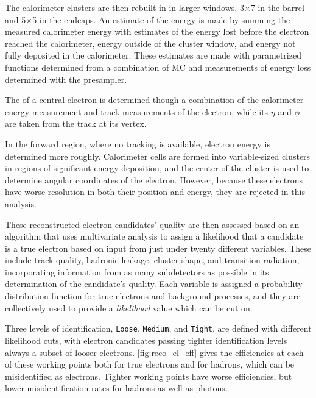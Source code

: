 The calorimeter clusters are then rebuilt in in larger windows, 3$\times$7 in the barrel and 5$\times$5 in the endcaps. An estimate of the energy is made by summing the measured calorimeter energy with estimates of the energy lost before the electron reached the calorimeter, energy outside of the cluster window, and energy not fully deposited in the calorimeter. These estimates are made with parametrized functions determined from a combination of \ac{MC} and measurements of energy loss determined with the presampler. 

The \pt of a central electron is determined though a combination of the calorimeter energy measurement and track measurements of the electron, while its $\eta$ and $\phi$ are taken from the track at its vertex. 

In the forward region, where no tracking is available, electron energy is determined more roughly. Calorimeter cells are formed into variable-sized clusters in regions of significant energy deposition, and the center of the cluster is used to determine angular coordinates of the electron. However, because these electrons have worse resolution in both their position and energy, they are rejected in this analysis. 

These reconstructed electron candidates' quality are then assessed based on an algorithm that uses multivariate analysis to assign a likelihood that a candidate is a true electron based on input from just under twenty different variables. These include track quality, hadronic leakage, cluster shape, and transition radiation, incorporating information from as many subdetectors as possible in its determination of the candidate's quality. Each variable is assigned a probability distribution function for true electrons and background processes, and they are collectively used to provide a \textit{likelihood} value which can be cut on. 

Three levels of identification, \texttt{Loose}, \texttt{Medium}, and \texttt{Tight}, are defined with different likelihood cuts, with electron candidates passing tighter identification levels always a subset of looser electrons. \autoref{fig:reco_el_eff} gives the efficiencies at each of these working points both for true electrons and for hadrons, which can be misidentified as electrons. Tighter working points have worse efficiencies, but lower misidentification rates for hadrons as well as photons. 

